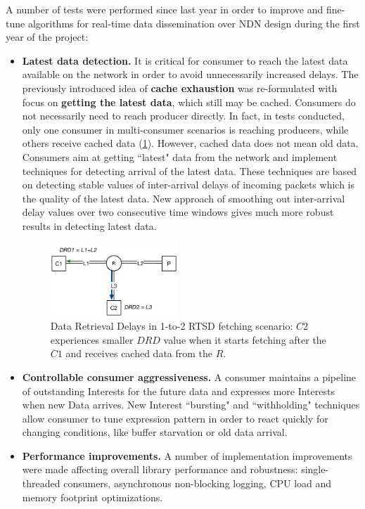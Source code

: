 \documentclass{article}
\begin{document}
A number of tests were performed since last year in order to improve and fine-tune algorithms for real-time data dissemination over NDN design during the first year of the project:
\begin{itemize}
\item \textbf{Latest data detection.} It is critical for consumer to reach the latest data available on the network in order to avoid unnecessarily increased delays. The previously introduced idea of \textbf{cache exhaustion} was re-formulated with focus on \textbf{getting the latest data}, which still may be cached. Consumers do not necessarily need to reach producer directly. In fact, in tests conducted, only one consumer in multi-consumer scenarios is reaching producers, while others receive cached data (\ref{fig:drd}). However, cached data does not mean old data. Consumers aim at getting ``latest" data from the network and implement techniques for detecting arrival of the latest data. These techniques are based on detecting stable values of inter-arrival delays of incoming packets which is the quality of the latest data. New approach of smoothing out inter-arrival delay values over two consecutive time windows gives much more robust results in detecting latest data.

\begin{figure}[t!]
\centering
\includegraphics[width=0.45\textwidth]{drd}
\caption{Data Retrieval Delays in 1-to-2 RTSD fetching scenario:  $C2$ experiences smaller $DRD$ value when it starts fetching after the $C1$ and receives cached data from the  $R$.}
\label{fig:drd}
\end{figure}

\item \textbf{Controllable consumer aggressiveness.} A consumer maintains a pipeline of outstanding Interests for the future data and expresses more Interests when new Data arrives. New Interest ``bursting" and ``withholding" techniques allow consumer to tune expression pattern in order to react quickly for changing conditions, like buffer starvation or old data arrival.
\item \textbf{Performance improvements.} A number of implementation improvements were made affecting overall library performance and robustness: single-threaded consumers, asynchronous non-blocking logging, CPU load and memory footprint optimizations.
\end{itemize}
\end{document}
